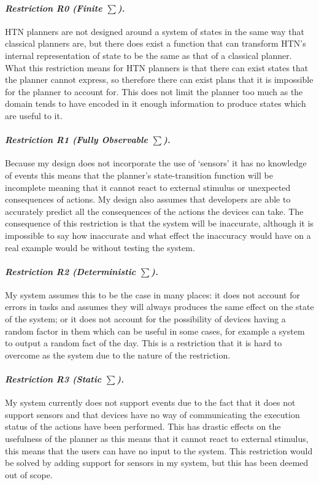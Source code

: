 \paragraph*{\textit{Restriction R0 (Finite $\sum$).}} HTN planners are not
designed around a system of states in the same way that classical planners are,
but there does exist a function that can transform HTN's internal representation
of state to be the same as that of a classical planner. What this restriction
means for HTN planners is that there can exist states that the planner cannot
express, so therefore there can exist plans that it is impossible for the
planner to account for. This does not limit the planner too much as the domain
tends to have encoded in it enough information to produce states which are
useful to it.

\paragraph*{\textit{Restriction R1 (Fully Observable $\sum$).}} Because my
design does not incorporate the use of `sensors' it has no knowledge of events
this means that the planner's state-transition function will be incomplete
meaning that it cannot react to external stimulus or unexpected consequences of
actions. My design also assumes that developers are able to accurately predict
all the consequences of the actions the devices can take. The consequence of
this restriction is that the system will be inaccurate, although it is
impossible to say how inaccurate and what effect the inaccuracy would have on a
real example would be without testing the system.

\paragraph*{\textit{Restriction R2 (Deterministic $\sum$).}} My system assumes
this to be the case in many places: it does not account for errors in tasks and
assumes they will always produces the same effect on the state of the system; or
it does not account for the possibility of devices having a random factor in
them which can be useful in some cases, for example a system to output a random
fact of the day. This is a restriction that it is hard to overcome as the system
due to the nature of the restriction.

\paragraph*{\textit{Restriction R3 (Static $\sum$).}} My system currently does
not support events due to the fact that it does not support sensors and that
devices have no way of communicating the execution status of the actions have
been performed. This has drastic effects on the usefulness of the planner as
this means that it cannot react to external stimulus, this means that the users
can have no input to the system. This restriction would be solved by adding
support for sensors in my system, but this has been deemed out of scope.

